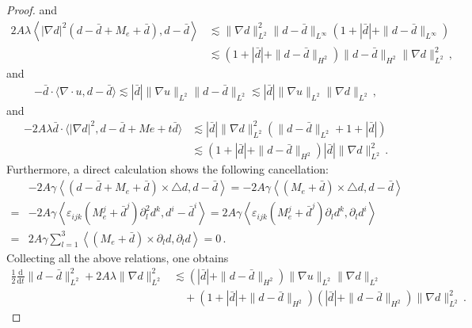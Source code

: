 \documentclass[reqno,11pt]{amsart}
\numberwithin{equation}{section}
\def\d{\mathrm{d}}
\begin{document}
\begin{proof}
and
\begin{equation*}
\begin{aligned}   
2A\lambda \left\langle |\nabla d|^2 (d - \bar{d} +M_e + \bar{d}), d - \bar{d} \right\rangle & \lesssim \| \nabla d \|_{L^2}^2 \| d - \bar{d} \|_{L^\infty} \left( 1 + |\bar{d}| + \| d - \bar{d} \|_{L^\infty} \right) \\
& \lesssim \left( 1 + |\bar{d}| + \| d - \bar{d} \|_{H^2} \right) \| d - \bar{d} \|_{H^2} \| \nabla d \|_{L^2}^2\,,
\end{aligned}
\end{equation*}
and
\begin{align*}
-\bar{d} \cdot \langle \nabla \cdot u, d-\bar{d} \rangle \lesssim | \bar{d} | \|\nabla u\|_{L^2} \|d-\bar{d}\|_{L^2} \lesssim | \bar{d} | \|\nabla u\|_{L^2} \|\nabla d\|_{L^2} \,,
\end{align*}
and
\begin{align*}
-2A \lambda \bar{d} \cdot \langle |\nabla d|^2, d-\bar{d} + Me + t\bar{d} \rangle & \lesssim | \bar{d} | \|\nabla d\|_{L^2}^2 \left( \|d-\bar{d}\|_{L^2} + 1 + | \bar{d} | \right) \\
& \lesssim \left(1+ | \bar{d} | + \|d-\bar{d}\|_{H^2}\right) | \bar{d} | \|\nabla d \|_{L^2}^2 \,.
\end{align*}
Furthermore, a direct calculation shows the following cancellation:
\begin{equation*}
\begin{aligned}  
 & -2A\gamma \left\langle (d - \bar{d} +M_e + \bar{d}) \times \triangle d, d - \bar{d} \right\rangle = -2A\gamma \left\langle (M_e + \bar{d}) \times \triangle d, d - \bar{d} \right\rangle \\
 = & -2A\gamma \left\langle \varepsilon_{ijk} \left(M_e^j + \bar{d}^j\right) \partial_l^2 d^k, d^i - \bar{d}^i \right\rangle = 2A\gamma \left\langle \varepsilon_{ijk} \left(M_e^j + \bar{d}^j\right) \partial_l d^k, \partial_l d^i \right\rangle \\
 = & 2A\gamma \sum_{l=1}^3 \left\langle (M_e + \bar{d}) \times \partial_l d, \partial_l d \right\rangle = 0 \,.
\end{aligned}
\end{equation*}
Collecting all the above relations, one obtains
\begin{equation}\label{d7}
\begin{aligned}
\frac{1}{2} \frac{\d}{\d t} \|d-\bar{d}\|_{L^2}^2 + 2A\lambda \|\nabla d\|_{L^2}^2 &\lesssim \left( | \bar{d} | + \|d-\bar{d}\|_{H^2} \right) \|\nabla u\|_{L^2} \|\nabla d\|_{L^2} \\
&\quad + \left(1+ |\bar{d} |+\|d-\bar{d}\|_{H^2}\right) \left( | \bar{d} | + \|d-\bar{d}\|_{H^2} \right) \|\nabla d\|_{L^2}^2 \,.
\end{aligned}
\end{equation}


\end{proof}
\end{document}
